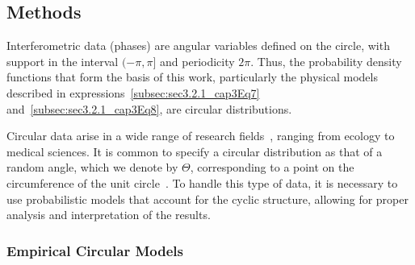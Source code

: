 \documentclass[remotesensing,article,submit,pdftex,moreauthors]{Definitions/mdpi}
\begin{document}
\subsection{Methods}\label{subsec:methods}

Interferometric data (phases) are angular variables defined on the circle, with support in the interval $(-\pi, \pi]$ and periodicity $2\pi$. 
Thus, the probability density functions that form the basis of this work, particularly the physical models described in expressions~\eqref{subsec:sec3.2.1_cap3Eq7} and~\eqref{subsec:sec3.2.1_cap3Eq8}, are circular distributions. 


Circular data arise in a wide range of research fields~\cite{OneDirection?ATutorialforCircularDataAnalysisUsingRWithExamplesinCognitivePsychology}, ranging from ecology to medical sciences. 
It is common to specify a circular distribution as that of a random angle, which we denote by $\Theta$, corresponding to a point on the circumference of the unit circle~\cite{CircularStatisticsinR}. 
To handle this type of data, it is necessary to use probabilistic models that account for the cyclic structure, allowing for proper analysis and interpretation of the results.

\subsubsection{Empirical Circular Models}\label{subsec:circulars_models}

\end{document}
